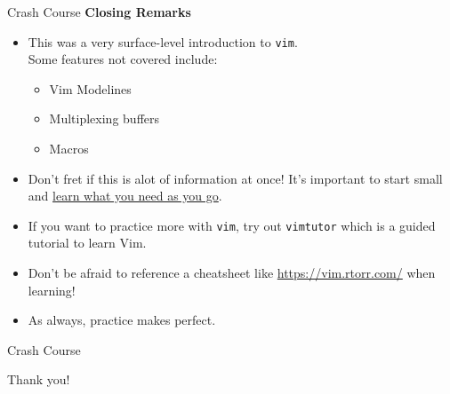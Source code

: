 \documentclass{beamer}
\begin{document}
\begin{frame}{Crash Course}
	\textbf{Closing Remarks}
	\begin{itemize}
		\item This was a very surface-level introduction to
			\texttt{vim}.\\
			Some features not covered include:
			\begin{itemize}
				\item Vim Modelines
				\item Multiplexing buffers
				\item Macros
			\end{itemize}
		\item Don't fret if this is alot of information at once! It's
			important to start small and \underline{learn what you
			need as you go}.
		\item If you want to practice more with \texttt{vim}, try out
			\texttt{vimtutor} which is a guided tutorial to learn
			Vim.
		\item Don't be afraid to reference a cheatsheet like
			\url{https://vim.rtorr.com/} when learning!
		\item As always, practice makes perfect.
	\end{itemize}
\end{frame}

\begin{frame}{Crash Course}
	\begin{center}
		\Huge Thank you!
	\end{center}
\end{frame}
\end{document}
